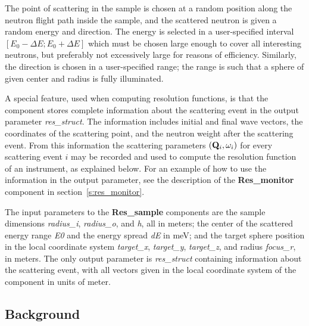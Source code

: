 The point of scattering in the sample is chosen at a random position
along the neutron flight path inside the sample, and the scattered
neutron is given a random energy and direction. The energy is selected in
a user-specified interval $[E_0-\Delta E; E_0+\Delta E]$ which must be
chosen large enough to cover all interesting neutrons, but preferably
not excessively large for reasons of efficiency. Similarly, the
direction is chosen in a user-specified range; the range is such that a
sphere of given center and radius is fully illuminated.

A special feature, used when computing resolution functions, is that the
component stores complete information about the scattering event in the
output parameter \textit{res\_struct}. The information includes initial
and final wave vectors, the coordinates of the scattering point, and the
neutron weight after the scattering event. From this information the
scattering parameters $({\bf Q}_i, \omega_i)$ for every scattering event
$i$ may be recorded and used to compute the resolution function of an
instrument, as explained below. For an example of how to use the
information in the output parameter, see the description of the
\textbf{Res\_monitor} component in section~\ref{s:res_monitor}.

The input parameters to the \textbf{Res\_sample} components are the
sample dimensions \textit{radius\_i}, \textit{radius\_o}, and
\textit{h}, all in meters; the center of the scattered energy range
\textit{E0} and the energy spread \textit{dE} in meV; and the target
sphere position in the local coordinate system \textit{target\_x},
\textit{target\_y}, \textit{target\_z}, and radius \textit{focus\_r}, in
meters. The only output parameter is \textit{res\_struct} containing
information about the scattering event, with all vectors given in the
local coordinate system of the component in units of meter.

\subsection{Background}

